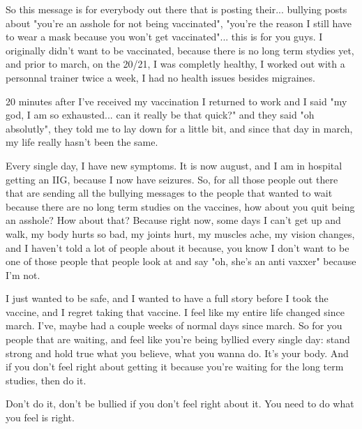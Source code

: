 So this message is for everybody out there that is posting their... bullying
posts about "you're an asshole for not being vaccinated", "you're the reason I
still have to wear a mask because you won't get vaccinated"... this is for you
guys.  I originally didn't want to be vaccinated, because there is no long term
stydies yet, and prior to march, on the 20/21, I was completly healthy, I worked
out with a personnal trainer twice a week, I had no health issues besides
migraines.

20 minutes after I've received my vaccination I returned to work and I said "my
god, I am so exhausted... can it really be that quick?" and they said "oh
absolutly", they told me to lay down for a little bit, and since that day in
march, my life really hasn't been the same.

Every single day, I have new symptoms. It is now august, and I am in hospital
getting an IIG, because I now have seizures. So, for all those people out there
that are sending all the bullying messages to the people that wanted to wait
because there are no long term studies on the vaccines, how about you quit being
an asshole? How about that? Because right now, some days I can't get up and
walk, my body hurts so bad, my joints hurt, my muscles ache, my vision changes,
and I haven't told a lot of people about it because, you know I don't want to be
one of those people that people look at and say "oh, she's an anti vaxxer"
because I'm not.

I just wanted to be safe, and I wanted to have a full story before I took the
vaccine, and I regret taking that vaccine.  I feel like my entire life changed
since march. I've, maybe had a couple weeks of normal days since march. So for
you people that are waiting, and feel like you're being byllied every single
day: stand strong and hold true what you believe, what you wanna do. It's your
body. And if you don't feel right about getting it because you're waiting for
the long term studies, then do it.

Don't do it, don't be bullied if you don't feel right about it. You need to do
what you feel is right.

